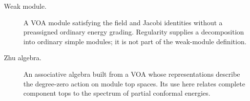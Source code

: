 \begin{description}
\item[Weak module.]A VOA module satisfying the field and
Jacobi identities without a preassigned ordinary energy grading.
Regularity supplies a decomposition into ordinary simple modules;
it is not part of the weak-module definition.

\item[Zhu algebra.]An associative algebra built from a VOA
whose representations describe the degree-zero action on
module top spaces. Its use here relates complete component
tops to the spectrum of partial conformal energies.

\end{description}
